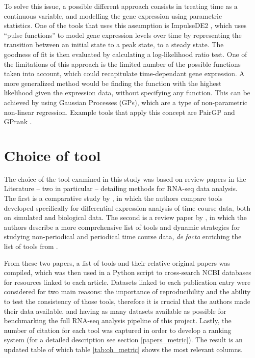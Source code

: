 To solve this issue, a possible different approach consists in treating time as a continuous variable, and modelling the gene expression using parametric statistics. One of the tools that uses this assumption is ImpulseDE2 \citep{fischerImpulseModelbasedDifferential2018}, which uses ``pulse functions'' to model gene expression levels over time by representing the transition between an initial state to a peak state, to a steady state. The goodness of fit is then evaluated by calculating a log-likelihood ratio test. One of the limitations of this approach is the limited number of the possible functions taken into account, which could recapitulate time-dependant gene expression. A more generalized method would be finding the function with the highest likelihood given the expression data, without specifying any function. This can be achieved by using Gaussian Processes (GPs), which are a type of non-parametric non-linear regression. Example tools that apply this concept are PairGP \citep{vantiniPairGPGaussianProcess2022} and GPrank \citep{topaGPrankPackageDetecting2018}.

\section{Choice of tool}
The choice of the tool examined in this study was based on review papers in the Literature -- two in particular -- detailing methods for RNA-seq data analysis. The first is a comparative study by \citet{spiesComparativeAnalysisDifferential2019}, in which the authors compare tools developed specifically for differential expression analysis of time course data, both on simulated and biological data.
The second is a review paper by \citet{ohTemporalDynamicMethods2021}, in which the authors describe a more comprehensive list of tools and dynamic strategies for studying non-periodical and periodical time course data, \textit{de facto} enriching the list of tools from \citeauthor{spiesComparativeAnalysisDifferential2019}.

From these two papers, a list of tools and their relative original papers was compiled, which was then used in a Python script to cross-search NCBI databases for resources linked to each article. Datasets linked to each publication entry were considered for two main reasons: the importance of reproducibility and the ability to test the consistency of those tools, therefore it is crucial that the authors made their data available, and having as many datasets available as possible for benchmarking the full RNA-seq analysis pipeline of this project. Lastly, the number of citation for each tool was captured in order to develop a ranking system (for a detailed description see section \ref{papers_metric}). The result is an updated table of which table \ref{tab:oh_metric} shows the most relevant columns.

